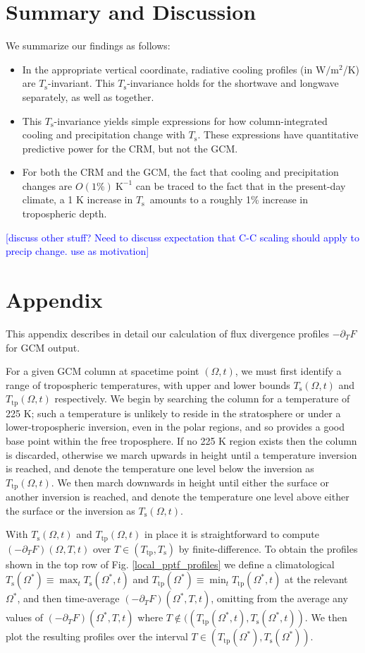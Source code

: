 \documentclass[10pt]{article}
\newcommand{\comment}[1]{\textcolor{blue}{[{#1}]}}
\newcommand{\ppt}{\ensuremath{\partial_T}}
\newcommand{\Wmsq}{\ensuremath{\mathrm{W/m^2}}}
\newcommand{\Ts}{\ensuremath{T_\mathrm{s}}}
\newcommand{\Ttp}{\ensuremath{T_\mathrm{tp}}}
\newcommand{\Kinverse}{\ensuremath{\mathrm{K^{-1}}}}
\begin{document}
\section{Summary and Discussion}
We summarize our findings as follows:
	\begin{itemize}
		\item In the appropriate vertical coordinate,  radiative cooling profiles (in \Wmsq /K) are  \Ts-invariant. This \Ts-invariance holds for the shortwave and longwave separately, as well as together.
		\item This \Ts-invariance yields simple expressions for how  column-integrated cooling and  precipitation  change with \Ts. These expressions have quantitative predictive power for the CRM, but not the GCM.
		\item For both the CRM and the GCM, the fact that cooling and precipitation changes are $O(1\%)\ \Kinverse$ can be traced to the fact that in the present-day climate, a 1 K increase in \Ts\ amounts to a roughly 1\% increase in tropospheric depth. 	\end{itemize}
		
\comment{discuss other stuff? Need to discuss expectation that C-C scaling should apply to precip change. use as motivation}		

\section{Appendix}
This appendix describes in detail our calculation of flux divergence profiles $-\ppt F$ for GCM output.

For a given GCM column at spacetime point $(\Omega,t)$, we must first identify a range of tropospheric temperatures, with upper and lower bounds $\Ts(\Omega,t)$ and $\Ttp(\Omega,t)$ respectively.  We begin by searching the column for a temperature of 225 K; such a temperature is unlikely to reside in the stratosphere or under a lower-tropospheric inversion, even in the polar regions, and so  provides a good base point within the free troposphere. If no 225 K region exists then the column is discarded, otherwise we march upwards in height until a temperature inversion is reached, and denote the temperature one level below the inversion as $\Ttp(\Omega,t)$. We then march downwards in height until either the surface or another inversion is reached, and denote the temperature one level above either the surface or the inversion as $\Ts(\Omega,t)$.

With $\Ts(\Omega,t)$ and $\Ttp(\Omega,t)$ in place it is straightforward to compute $(-\ppt F)(\Omega,T,t)$ over $T\in(\Ttp,\Ts)$ by finite-difference. To obtain the profiles shown in the top row of Fig. \ref{local_pptf_profiles} we define a climatological $\Ts(\Omega^*)\equiv \max_t \Ts(\Omega^*,t)$ and $\Ttp(\Omega^*)\equiv \min_t \Ttp(\Omega^*,t)$ at the relevant $\Omega^*$, and  then time-average  $(-\ppt F)(\Omega^*,T,t)$, omitting from the average any values of $(-\ppt F)(\Omega^*,T,t)$ where $T \notin ((\Ttp(\Omega^*,t),\Ts(\Omega^*,t))$. We then plot the resulting profiles over the interval $T\in(\Ttp(\Omega^*),\Ts(\Omega^*))$. 
\end{document}
